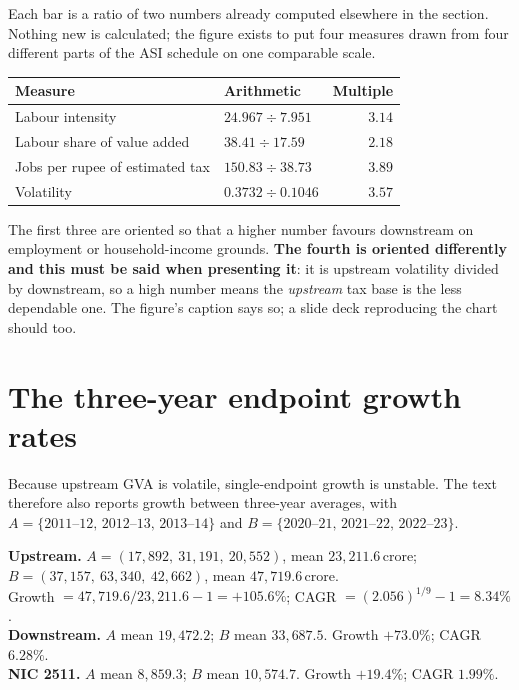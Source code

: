 \documentclass[11pt, a4paper]{article}
\newcommand{\cro}{\,\textrm{crore}}
\begin{document}
Each bar is a ratio of two numbers already computed elsewhere in the section. Nothing
new is calculated; the figure exists to put four measures drawn from four different
parts of the ASI schedule on one comparable scale.

\begin{table}[H]
\centering\small
\begin{tabular}{llr}
\toprule
\textbf{Measure} & \textbf{Arithmetic} & \textbf{Multiple} \\
\midrule
Labour intensity & $24.967 \div 7.951$ & $3.14$ \\
Labour share of value added & $38.41 \div 17.59$ & $2.18$ \\
Jobs per rupee of estimated tax & $150.83 \div 38.73$ & $3.89$ \\
Volatility & $0.3732 \div 0.1046$ & $3.57$ \\
\bottomrule
\end{tabular}
\end{table}

\noindent The first three are oriented so that a higher number favours downstream on
employment or household-income grounds. \textbf{The fourth is oriented differently and
this must be said when presenting it}: it is upstream volatility divided by downstream,
so a high number means the \emph{upstream} tax base is the less dependable one. The
figure's caption says so; a slide deck reproducing the chart should too.

\section{The three-year endpoint growth rates}
\label{sec:3yr}

Because upstream GVA is volatile, single-endpoint growth is unstable. The text
therefore also reports growth between three-year averages, with
$A = \{2011\text{--}12,\,2012\text{--}13,\,2013\text{--}14\}$ and
$B = \{2020\text{--}21,\,2021\text{--}22,\,2022\text{--}23\}$.

\begin{work}
\textbf{Upstream.} $A = (17{,}892,\ 31{,}191,\ 20{,}552)$, mean $23{,}211.6\cro$;
$B = (37{,}157,\ 63{,}340,\ 42{,}662)$, mean $47{,}719.6\cro$. \\
Growth $= 47{,}719.6/23{,}211.6 - 1 = +105.6\%$;
CAGR $= (2.056)^{1/9} - 1 = 8.34\%$. \\[3pt]
\textbf{Downstream.} $A$ mean $19{,}472.2$; $B$ mean $33{,}687.5$.
Growth $+73.0\%$; CAGR $6.28\%$. \\[3pt]
\textbf{NIC 2511.} $A$ mean $8{,}859.3$; $B$ mean $10{,}574.7$.
Growth $+19.4\%$; CAGR $1.99\%$.
\end{work}
\end{document}
